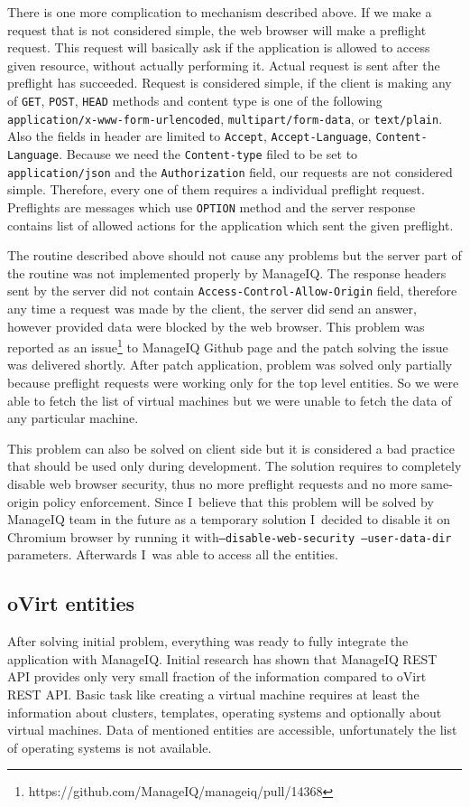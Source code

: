There is one more complication to mechanism described above. If we make a request that is not considered simple, the web browser will make a preflight request. This request will basically ask if the application is allowed to access given resource, without actually performing it. Actual request is sent after the preflight has succeeded. Request is considered simple, if the client is making any of \texttt{GET}, \texttt{POST}, \texttt{HEAD} methods and content type is one of the following \texttt{application/x-www-form-urlencoded}, \texttt{multipart/form-data}, or \texttt{text/plain}. Also the fields in header are limited to \texttt{Accept}, \texttt{Accept-Language}, \texttt{Content-Language}. Because we need the \texttt{Content-type} filed to be set to \texttt{application/json} and the \texttt{Authorization} field, our requests are not considered simple. Therefore, every one of them requires a individual preflight request. Preflights are messages which use \texttt{OPTION} method and the server response contains list of allowed actions for the application which sent the given preflight.

The routine described above should not cause any problems but the server part of the routine was not implemented properly by ManageIQ. The response headers sent by the server did not contain \texttt{Access-Control-Allow-Origin} field, therefore any time a request was made by the client, the server did send an answer, however provided data were blocked by the web browser. This problem was reported as an issue\footnote{https://github.com/ManageIQ/manageiq/pull/14368} to ManageIQ Github page and the patch solving the issue was delivered shortly. After patch application, problem was solved only partially because preflight requests were working only for the top level entities. So we were able to fetch the list of virtual machines but we were unable to fetch the data of any particular machine.

This problem can also be solved on client side but it is considered a bad practice that should be used only during development. The solution requires to completely disable web browser security, thus no more preflight requests and no more same-origin policy enforcement. Since I~believe that this problem will be solved by ManageIQ team in the future as a temporary solution I~decided to disable it on Chromium browser by running it with\texttt{--disable-web-security --user-data-dir} parameters. Afterwards I~was able to access all the entities.

\subsection{oVirt entities}
After solving initial problem, everything was ready to fully integrate the application with ManageIQ. Initial research has shown that ManageIQ REST API provides only very small fraction of the information compared to oVirt REST API.
Basic task like creating a virtual machine requires at least the information about clusters, templates, operating systems and optionally about virtual machines. Data of mentioned entities are accessible, unfortunately the list of operating systems is not available. 

